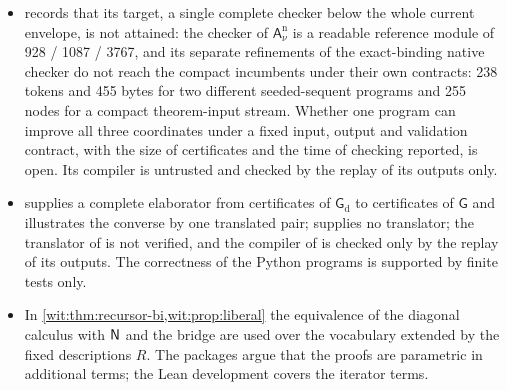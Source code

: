 \begin{itemize}
 the wrong arity, and the package includes it only as a rejected
 experiment.  The package argues that simple changes of the depth offset of
 the compact traversal lose the no-capture property of the opening, and that
 totalizing decoders which admit malformed syntax lose the formula round
 trips unless a normalization is added to the checking contract; these are
 limits of the rewrites tried, not lower bounds.  Whether the equational
 interface of  can be built into a smaller complete checker
 is open.
\item {} records that its target, a single complete
 checker below the whole current envelope, is not attained: the checker of
 $\mathsf{A}^{\mathrm n}_{\nu}$ is a readable reference module of
 928 / 1087 / 3767, and its separate refinements of the exact-binding
 native checker do not reach the compact incumbents under their own
 contracts: 238 tokens and 455 bytes for two different seeded-sequent
 programs and 255 nodes for a compact theorem-input stream.  Whether one program can improve all three
 coordinates under a fixed input, output and validation contract, with the
 size of certificates and the time of checking reported, is open.  Its
 compiler is untrusted and checked by the replay of its outputs only.
\item {} supplies a complete elaborator from
 certificates of $\mathsf{G}_{\mathrm d}$ to certificates of $\mathsf{G}$
 and illustrates the converse by one translated pair; 
 supplies no translator; the translator of  is not
 verified, and the compiler of  is checked only by
 the replay of its outputs.  The correctness of the Python programs is supported by finite
 tests only.
\item In \cref{wit:thm:recursor-bi,wit:prop:liberal} the equivalence of the
 diagonal calculus with $\mathsf{N}$ and the bridge are used over the vocabulary
 extended by the fixed descriptions $R$.  The packages argue that the
 proofs are parametric in additional terms; the Lean development covers the
 iterator terms.
\end{itemize}

